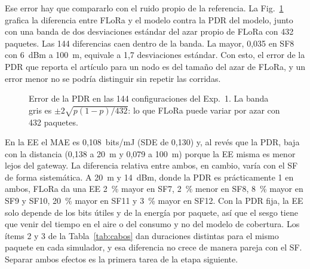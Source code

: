 \documentclass[conference,a4paper]{IEEEtran}
\begin{document}
Ese error hay que compararlo con el ruido propio de la referencia. La Fig.~\ref{fig:error} grafica la diferencia entre FLoRa y el modelo contra la PDR del modelo, junto con una banda de dos desviaciones estándar del azar propio de FLoRa con 432 paquetes. Las 144 diferencias caen dentro de la banda. La mayor, 0,035 en SF8 con 6~dBm a 100~m, equivale a 1,7 desviaciones estándar.
Con esto, el error de la PDR que reporta el artículo para un nodo es del tamaño del azar de FLoRa, y un error menor no se podría distinguir sin repetir las corridas.

\begin{figure}[t]
\centering
{}
\caption{Error de la PDR en las 144 configuraciones del Exp.~1. La banda gris es $\pm2\sqrt{p(1-p)/432}$: lo que FLoRa puede variar por azar con 432 paquetes.}
\label{fig:error}
\end{figure}

En la EE el MAE es 0,108~bits/mJ (SDE de 0,130) y, al revés que la PDR, baja con la distancia (0,138 a 20~m y 0,079 a 100~m) porque la EE misma es menor lejos del gateway. La diferencia relativa entre ambos, en cambio, varía con el SF de forma sistemática. A 20~m y 14~dBm, donde la PDR es prácticamente 1 en ambos, FLoRa da una EE 2~\% mayor en SF7, 2~\% menor en SF8, 8~\% mayor en SF9 y SF10, 20~\% mayor en SF11 y 3~\% mayor en SF12. Con la PDR fija, la EE solo depende de los bits útiles y de la energía por paquete, así que el sesgo tiene que venir del tiempo en el aire o del consumo y no del modelo de cobertura. Los ítems 2 y 3 de la Tabla~\ref{tab:cabos} dan duraciones distintas para el mismo paquete en cada simulador, y esa diferencia no crece de manera pareja con el SF. Separar ambos efectos es la primera tarea de la etapa siguiente.
\end{document}
